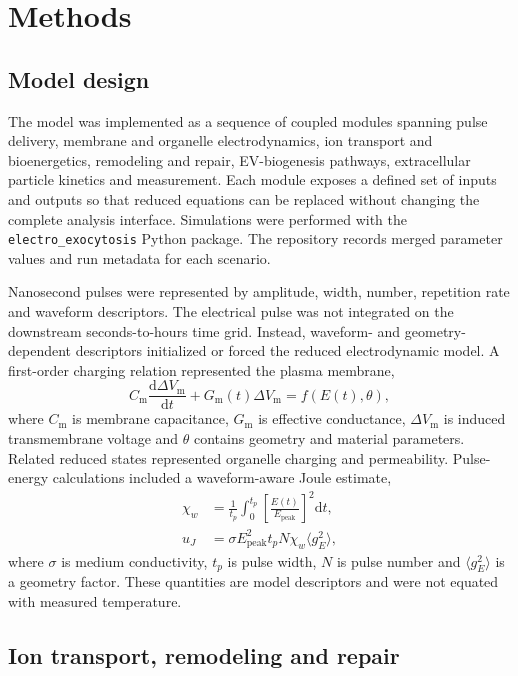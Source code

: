 \section*{Methods}

\subsection*{Model design}

The model was implemented as a sequence of coupled modules spanning pulse delivery, membrane and organelle electrodynamics, ion transport and bioenergetics, remodeling and repair, EV-biogenesis pathways, extracellular particle kinetics and measurement. Each module exposes a defined set of inputs and outputs so that reduced equations can be replaced without changing the complete analysis interface. Simulations were performed with the \texttt{electro\_exocytosis} Python package. The repository records merged parameter values and run metadata for each scenario.

Nanosecond pulses were represented by amplitude, width, number, repetition rate and waveform descriptors. The electrical pulse was not integrated on the downstream seconds-to-hours time grid. Instead, waveform- and geometry-dependent descriptors initialized or forced the reduced electrodynamic model. A first-order charging relation represented the plasma membrane,
\begin{equation}
C_{\mathrm m}\frac{\mathrm d\Delta V_{\mathrm m}}{\mathrm dt}+G_{\mathrm m}(t)\Delta V_{\mathrm m}=f(E(t),\theta),
\end{equation}
where $C_{\mathrm m}$ is membrane capacitance, $G_{\mathrm m}$ is effective conductance, $\Delta V_{\mathrm m}$ is induced transmembrane voltage and $\theta$ contains geometry and material parameters. Related reduced states represented organelle charging and permeability. Pulse-energy calculations included a waveform-aware Joule estimate,
\begin{align}
\chi_{w}&=\frac{1}{t_{p}}\int_{0}^{t_{p}}\left[\frac{E(t)}{E_{\mathrm{peak}}}\right]^2\mathrm dt,\\
u_{J}&=\sigma E_{\mathrm{peak}}^2t_{p}N\chi_{w}\langle g_E^2\rangle,
\end{align}
where $\sigma$ is medium conductivity, $t_p$ is pulse width, $N$ is pulse number and $\langle g_E^2\rangle$ is a geometry factor. These quantities are model descriptors and were not equated with measured temperature.

\subsection*{Ion transport, remodeling and repair}

